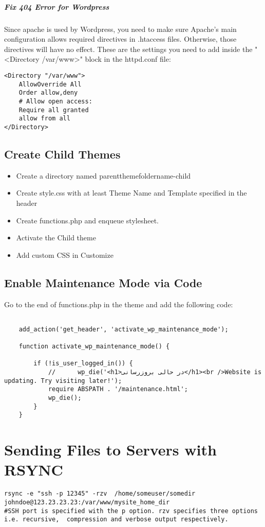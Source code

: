\documentclass{article}
\begin{document}
\subparagraph{Fix 404 Error for Wordpress}
Since apache is used by Wordpress, you need to make sure Apache's main configuration allows required directives in .htaccess files. Otherwise, those directives will have no effect. These are the settings you need to add inside the "<Directory /var/www>" block in the httpd.conf file:
\begin{lstlisting}
<Directory "/var/www">
    AllowOverride All
    Order allow,deny
    # Allow open access:
    Require all granted
    allow from all
</Directory>
\end{lstlisting}

\subsection{Create Child Themes}
\begin{itemize}
\item Create a directory named parentthemefoldername-child
\item Create style.css with at least Theme Name and Template specified in the header
\item Create functions.php and enqueue stylesheet.
\item Activate the Child theme
\item Add custom CSS in Customize 
\end{itemize}

\subsection{Enable Maintenance Mode via Code}
Go to the end of functions.php in the theme and add the following code:

\begin{verbatim}
	
	add_action('get_header', 'activate_wp_maintenance_mode');
	
	function activate_wp_maintenance_mode() {
		
		if (!is_user_logged_in()) {
			// 		wp_die('<h1>در حالی بروزرسانی</h1><br />Website is updating. Try visiting later!');
			require ABSPATH . '/maintenance.html';
			wp_die();
		}
	}
\end{verbatim}

\section{Sending Files to Servers with RSYNC}

\begin{verbatim}
rsync -e "ssh -p 12345" -rzv  /home/someuser/somedir  johndoe@123.23.23.23:/var/www/mysite_home_dir
#SSH port is specified with the p option. rzv specifies three options i.e. recursive,  compression and verbose output respectively. 
\end{verbatim}
\end{document}
